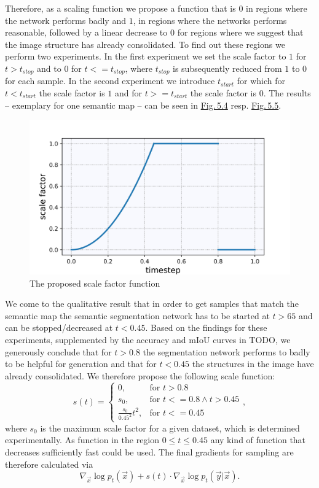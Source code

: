 Therefore, as a scaling function we propose a function that is $0$ in regions where the network performs badly and $1$, in regions where the networks performs reasonable, followed by a linear decrease to $0$ for regions where we suggest that the image structure has already consolidated. To find out these regions we perform two experiments. In the first experiment we set the scale factor to $1$ for $t>t_{stop}$ and to $0$ for $t<=t_{stop}$, where $t_{stop}$ is subsequently reduced from $1$ to $0$ for each sample. In the second experiment we introduce $t_{start}$ for which for $t<t_{start}$ the scale factor is $1$ and for $t>=t_{start}$ the scale factor is $0$. The results – exemplary for one semantic map – can be seen in \hyperref[fig:5.4]{Fig.\,5.4} resp. \hyperref[fig:5.5]{Fig.\,5.5}.

%
\begin{figure} \label{fig:5.2}
    \centering
    \includegraphics[width=.65\textwidth]{Chapters/figures/experiments/scale/scale_function.jpg}
    \caption{The proposed scale factor function}
\end{figure}
%
We come to the qualitative result that in order to get samples that match the semantic map the semantic segmentation network has to be started at $t>65$ and can be stopped/decreased at $t<0.45$.  Based on the findings for these experiments, supplemented by the accuracy and mIoU curves in TODO, we generously conclude that for $t>0.8$ the segmentation network performs to badly to be helpful for generation and that for $t<0.45$ the structures in the image have already consolidated. We therefore propose the following scale function:
%
\begin{equation} \label{equ:5.5}
    s(t)=\begin{cases}
        0, &\text{for }t>0.8\\
        s_0, &\text{for }t<=0.8 \land t>0.45\\
        \frac{s_0}{0.45^2}t^2, &\text{for }t<=0.45
    \end{cases},
\end{equation}
%
where $s_0$ is the maximum scale factor for a given dataset, which is determined experimentally. As function in the region $0\leq t\leq0.45$ any kind of function that decreases sufficiently fast could be used. The final gradients for sampling are therefore calculated via
%
\begin{equation}
    \nabla_{\vec{x}}\log p_t(\vec{x})+s(t)\cdot\nabla_{\vec{x}}\log p_t(\vec{y}|\vec{x}).
\end{equation}

